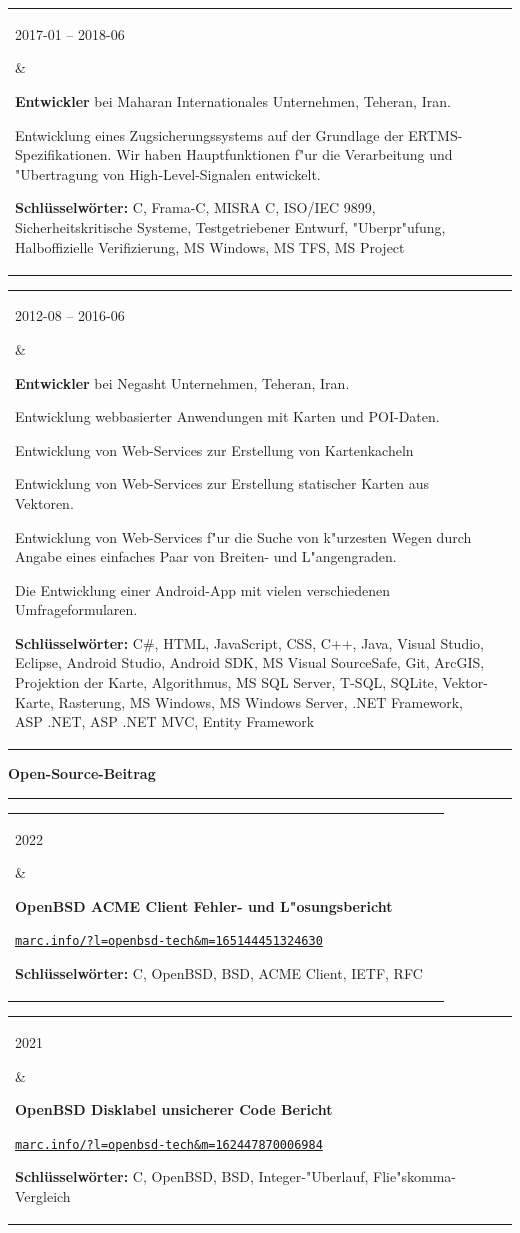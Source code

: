 \documentclass[11pt,a4paper,oneside]{article}
\makeatletter
\newcommand{\https}[1]{\href{https://#1}{\nolinkurl{#1}}}
\newcommand{\keywords}[1]{\textbf{Schl\"{u}sselw\"{o}rter:} #1}
\renewcommand{\section}[1]{%
{\large\textbf{#1}}\\
\rule[9pt]{18cm}{.4pt}\vspace{-16pt}%
}
\newenvironment{mytable}{%
\begin{tabular}{@{}l@{\hspace{4mm}}l@{}}%
}{\end{tabular}}
\newcommand{\myitem}[2]{%
\parbox[t]{16mm}{#1}&\parbox[t]{16cm}{#2}\\%
}
\makeatother
\begin{document}
\begin{mytable}
\myitem{2017-01 -- 2018-06}{
\textbf{Entwickler} bei
Maharan Internationales Unternehmen, Teheran, Iran.

Entwicklung eines Zugsicherungssystems auf der Grundlage
der ERTMS-Spezifikationen.
Wir haben Hauptfunktionen f"ur die Verarbeitung und "Ubertragung
von High-Level-Signalen entwickelt.

\keywords{%
	C, Frama-C, MISRA C, ISO/IEC 9899, Sicherheitskritische Systeme,
	Testgetriebener Entwurf, "Uberpr"ufung,
	Halboffizielle Verifizierung,
	MS Windows, MS TFS, MS Project
}
}
\end{mytable}

\begin{mytable}
\myitem{2012-08 -- 2016-06}{
\textbf{Entwickler} bei
Negasht Unternehmen, Teheran, Iran.

Entwicklung webbasierter Anwendungen mit Karten und POI-Daten.

Entwicklung von Web-Services zur Erstellung von Kartenkacheln

Entwicklung von Web-Services zur Erstellung statischer Karten
aus Vektoren.

Entwicklung von Web-Services f"ur die Suche von k"urzesten Wegen
durch Angabe eines einfaches Paar von Breiten- und L"angengraden.

Die Entwicklung einer Android-App mit vielen verschiedenen
Umfrageformularen.

\keywords{%
	C\#, HTML, JavaScript, CSS, C++, Java, Visual Studio, Eclipse,
	Android Studio, Android SDK, MS Visual SourceSafe, Git, ArcGIS,
	Projektion der Karte, Algorithmus, MS SQL Server, T-SQL, SQLite,
	Vektor-Karte, Rasterung, MS Windows, MS Windows Server,
	.NET Framework, ASP .NET, ASP .NET MVC, Entity Framework
}
}
\end{mytable}

\section{Open-Source-Beitrag}

\begin{mytable}
\myitem{2022}{%
\textbf{OpenBSD ACME Client Fehler- und L"osungsbericht}

\https{marc.info/?l=openbsd-tech&m=165144451324630}

\keywords{C, OpenBSD, BSD, ACME Client, IETF, RFC}
}
\end{mytable}

\begin{mytable}
\myitem{2021}{%
\textbf{OpenBSD Disklabel unsicherer Code Bericht}

\https{marc.info/?l=openbsd-tech&m=162447870006984}

\keywords{C, OpenBSD, BSD, Integer-"Uberlauf, Flie"skomma-Vergleich}
}
\end{mytable}
\end{document}
